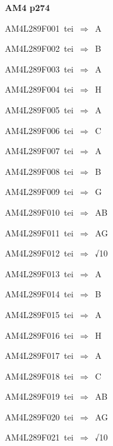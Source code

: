 \par\vfill\eject
{\bf\hfill AM4 p274\hfill\hbox{}}\par\bigskip
{\sixrm AM4L289F001\ {\sixit tei}\ }$\Rightarrow$\ {\tenit A}\par\smallskip
{\sixrm AM4L289F002\ {\sixit tei}\ }$\Rightarrow$\ {\tenit B}\par\smallskip
{\sixrm AM4L289F003\ {\sixit tei}\ }$\Rightarrow$\ {\tenit A}\par\smallskip
{\sixrm AM4L289F004\ {\sixit tei}\ }$\Rightarrow$\ {\tenit H}\par\smallskip
{\sixrm AM4L289F005\ {\sixit tei}\ }$\Rightarrow$\ {\tenit A}\par\smallskip
{\sixrm AM4L289F006\ {\sixit tei}\ }$\Rightarrow$\ {\tenit C}\par\smallskip
{\sixrm AM4L289F007\ {\sixit tei}\ }$\Rightarrow$\ {\tenit A}\par\smallskip
{\sixrm AM4L289F008\ {\sixit tei}\ }$\Rightarrow$\ {\tenit B}\par\smallskip
{\sixrm AM4L289F009\ {\sixit tei}\ }$\Rightarrow$\ {\tenit G}\par\smallskip
{\sixrm AM4L289F010\ {\sixit tei}\ }$\Rightarrow$\ AB\par\smallskip
{\sixrm AM4L289F011\ {\sixit tei}\ }$\Rightarrow$\ AG\par\smallskip
{\sixrm AM4L289F012\ {\sixit tei}\ }$\Rightarrow$\ √10\par\smallskip
{\sixrm AM4L289F013\ {\sixit tei}\ }$\Rightarrow$\ {\tenit A}\par\smallskip
{\sixrm AM4L289F014\ {\sixit tei}\ }$\Rightarrow$\ {\tenit B}\par\smallskip
{\sixrm AM4L289F015\ {\sixit tei}\ }$\Rightarrow$\ {\tenit A}\par\smallskip
{\sixrm AM4L289F016\ {\sixit tei}\ }$\Rightarrow$\ {\tenit H}\par\smallskip
{\sixrm AM4L289F017\ {\sixit tei}\ }$\Rightarrow$\ {\tenit A}\par\smallskip
{\sixrm AM4L289F018\ {\sixit tei}\ }$\Rightarrow$\ {\tenit C}\par\smallskip
{\sixrm AM4L289F019\ {\sixit tei}\ }$\Rightarrow$\ AB\par\smallskip
{\sixrm AM4L289F020\ {\sixit tei}\ }$\Rightarrow$\ AG\par\smallskip
{\sixrm AM4L289F021\ {\sixit tei}\ }$\Rightarrow$\ √10\par\smallskip

